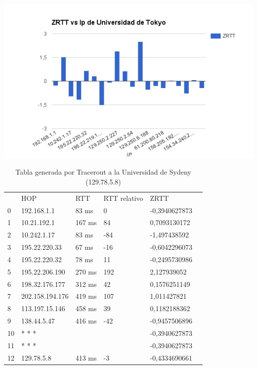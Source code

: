 \begin{center}
\includegraphics[width=\textwidth]{imgs/tokyo.png}
\end{center}

\begin{table}[]
\centering
\caption{Tabla generada por Tracerout a la Universidad de Sydeny (129.78.5.8)}
\label{my-label}
\begin{tabular}{llllll}
   & HOP             & RTT    & RTT relativo & ZRTT          \\
0  & 192.168.1.1     & 83 ms  & 0            & -0,3940627873 \\
1  & 10.21.192.1     & 167 ms & 84           & 0,7093130172  \\
2  & 10.242.1.17     & 83 ms  & -84          & -1,497438592  \\
3  & 195.22.220.33   & 67 ms  & -16          & -0,6042296073 \\
4  & 195.22.220.32   & 78 ms  & 11           & -0,2495730986 \\
5  & 195.22.206.190  & 270 ms & 192          & 2,127939052   \\
6  & 198.32.176.177  & 312 ms & 42           & 0,1576251149  \\
7  & 202.158.194.176 & 419 ms & 107          & 1,011427821   \\
8  & 113.197.15.146  & 458 ms & 39           & 0,1182188362  \\
9  & 138.44.5.47     & 416 ms & -42          & -0,9457506896 \\
10 & * * *           &        &              & -0,3940627873 \\
11 & * * *           &        &              & -0,3940627873 \\
12 & 129.78.5.8      & 413 ms & -3           & -0,4334690661
\end{tabular}
\end{table}


